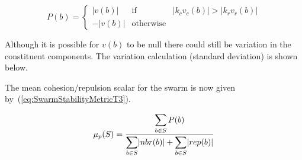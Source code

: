 \documentclass{ieeeaccess}
\begin{document}
\begin{equation}
\label{eq:CohesionRepulsion}
P(b) = \left\{\begin{array}{lll}
               |v(b)|& \mathrm{if} & |k_cv_c(b)| > |k_r v_r(b)|\\
              -|v(b)|& \mathrm{otherwise}
              \end{array}\right.
\end{equation}

Although it is possible for $v(b)$ to be null there could still be variation in the constituent components. The variation calculation (standard deviation) is shown below. 



The mean cohesion/repulsion scalar for the swarm is now given by~(\ref{eq:SwarmStabilityMetricT3}).  

\begin{equation}
\label{eq:SwarmStabilityMetricT3}
\mu_p(S) = \frac{\mathlarger{\sum_{b \in S} P(b)}}{\mathlarger{\sum_{b \in S}}|nbr(b)| + \mathlarger{\sum_{b \in S}}|rep(b)|}
\end{equation}

\end{document}

